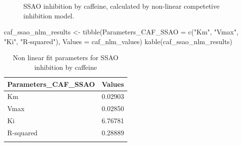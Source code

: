 \documentclass[
  letterpaper,
  DIV=11,
  numbers=noendperiod]{scrreprt}
\newenvironment{Shaded}{\begin{snugshade}}{\end{snugshade}}
\newcommand{\AttributeTok}[1]{\textcolor[rgb]{0.40,0.45,0.13}{#1}}
\newcommand{\FunctionTok}[1]{\textcolor[rgb]{0.28,0.35,0.67}{#1}}
\newcommand{\NormalTok}[1]{\textcolor[rgb]{0.00,0.23,0.31}{#1}}
\newcommand{\OtherTok}[1]{\textcolor[rgb]{0.00,0.23,0.31}{#1}}
\newcommand{\StringTok}[1]{\textcolor[rgb]{0.13,0.47,0.30}{#1}}
\begin{document}
\begin{figure}[H]


\caption{\label{fig-CAF-CI}SSAO inhibition by caffeine, calculated by
non-linear competetive inhibition model.}

\end{figure}%

\begin{Shaded}
\begin{Highlighting}[]
\NormalTok{caf\_ssao\_nlm\_results }\OtherTok{\textless{}{-}} \FunctionTok{tibble}\NormalTok{(}\AttributeTok{Parameters\_CAF\_SSAO =} \FunctionTok{c}\NormalTok{(}\StringTok{"Km"}\NormalTok{, }\StringTok{"Vmax"}\NormalTok{, }\StringTok{"Ki"}\NormalTok{, }\StringTok{"R{-}squared"}\NormalTok{), }
                               \AttributeTok{Values =}\NormalTok{ caf\_nlm\_values)}
\FunctionTok{kable}\NormalTok{(caf\_ssao\_nlm\_results)}
\end{Highlighting}
\end{Shaded}

\begin{longtable}[]{@{}ll@{}}

\toprule\noalign{}
Parameters\_CAF\_SSAO & Values \\
\midrule\noalign{}
\endhead
\bottomrule\noalign{}
\endlastfoot
Km & 0.02903 \\
Vmax & 0.02850 \\
Ki & 6.76781 \\
R-squared & 0.28889 \\

\caption{\label{tbl-nlm-caf-fit}Non linear fit parameters for SSAO
inhibition by caffeine}

\tabularnewline

\end{longtable}
\end{document}
